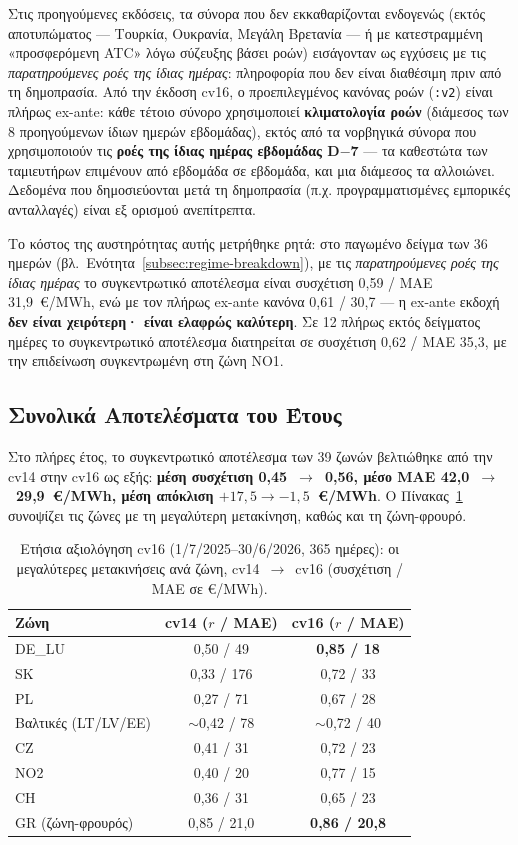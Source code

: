 Στις προηγούμενες εκδόσεις, τα σύνορα που δεν εκκαθαρίζονται ενδογενώς (εκτός αποτυπώματος --- Τουρκία, Ουκρανία, Μεγάλη Βρετανία --- ή με κατεστραμμένη «προσφερόμενη ATC» λόγω σύζευξης βάσει ροών) εισάγονταν ως εγχύσεις με τις \emph{παρατηρούμενες ροές της ίδιας ημέρας}: πληροφορία που δεν είναι διαθέσιμη πριν από τη δημοπρασία. Από την έκδοση cv16, ο προεπιλεγμένος κανόνας ροών (\texttt{:v2}) είναι πλήρως ex-ante: κάθε τέτοιο σύνορο χρησιμοποιεί \textbf{κλιματολογία ροών} (διάμεσος των 8 προηγούμενων ίδιων ημερών εβδομάδας), εκτός από τα νορβηγικά σύνορα που χρησιμοποιούν τις \textbf{ροές της ίδιας ημέρας εβδομάδας D$-$7} --- τα καθεστώτα των ταμιευτήρων επιμένουν από εβδομάδα σε εβδομάδα, και μια διάμεσος τα αλλοιώνει. Δεδομένα που δημοσιεύονται μετά τη δημοπρασία (π.χ. προγραμματισμένες εμπορικές ανταλλαγές) είναι εξ ορισμού ανεπίτρεπτα.

Το κόστος της αυστηρότητας αυτής μετρήθηκε ρητά: στο παγωμένο δείγμα των 36 ημερών (βλ.\ Ενότητα~\ref{subsec:regime-breakdown}), με τις \emph{παρατηρούμενες ροές της ίδιας ημέρας} το συγκεντρωτικό αποτέλεσμα είναι συσχέτιση 0,59 / MAE 31,9~€/MWh, ενώ με τον πλήρως ex-ante κανόνα 0,61 / 30,7 --- η ex-ante εκδοχή \textbf{δεν είναι χειρότερη· είναι ελαφρώς καλύτερη}. Σε 12 πλήρως εκτός δείγματος ημέρες το συγκεντρωτικό αποτέλεσμα διατηρείται σε συσχέτιση 0,62 / MAE 35,3, με την επιδείνωση συγκεντρωμένη στη ζώνη NO1.

\subsection{Συνολικά Αποτελέσματα του Έτους}
\label{subsec:cv16-aggregate}

Στο πλήρες έτος, το συγκεντρωτικό αποτέλεσμα των 39 ζωνών βελτιώθηκε από την cv14 στην cv16 ως εξής: \textbf{μέση συσχέτιση 0,45~$\to$~0,56, μέσο MAE 42,0~$\to$~29,9~€/MWh, μέση απόκλιση $+17{,}5 \to -1{,}5$~€/MWh}. Ο Πίνακας~\ref{tab:cv16-movers} συνοψίζει τις ζώνες με τη μεγαλύτερη μετακίνηση, καθώς και τη ζώνη-φρουρό.

\begin{table}[htbp]
\centering
\caption{Ετήσια αξιολόγηση cv16 (1/7/2025--30/6/2026, 365 ημέρες): οι μεγαλύτερες μετακινήσεις ανά ζώνη, cv14~$\to$~cv16 (συσχέτιση / MAE σε €/MWh).}
\label{tab:cv16-movers}
\begin{tabular}{@{}lcc@{}}
\toprule
\textbf{Ζώνη} & \textbf{cv14 ($r$ / MAE)} & \textbf{cv16 ($r$ / MAE)} \\
\midrule
DE\_LU & 0,50 / 49 & \textbf{0,85 / 18} \\
SK & 0,33 / 176 & 0,72 / 33 \\
PL & 0,27 / 71 & 0,67 / 28 \\
Βαλτικές (LT/LV/EE) & $\sim$0,42 / 78 & $\sim$0,72 / 40 \\
CZ & 0,41 / 31 & 0,72 / 23 \\
NO2 & 0,40 / 20 & 0,77 / 15 \\
CH & 0,36 / 31 & 0,65 / 23 \\
\midrule
GR (ζώνη-φρουρός) & 0,85 / 21,0 & \textbf{0,86 / 20,8} \\
\bottomrule
\end{tabular}
\end{table}


